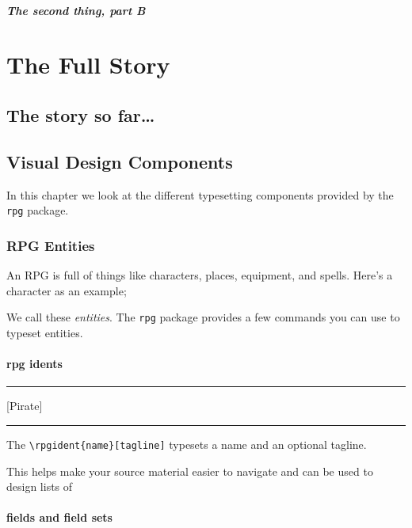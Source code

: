 \lipsum[5]

\subsubsection{The second thing, part B}

\lipsum[6]

\part{The Full Story}

\chapter{The story so far\ldots}



\chapter{Visual Design Components}

In this chapter we look at the different typesetting components provided by the \texttt{rpg} package.

\section{RPG Entities}

An RPG is full of things like characters, places, equipment, and spells. Here's a character as an example;

\rpgdoublevskip

\rpgdoublevskip

We call these \emph{entities}. The \texttt{rpg} package provides a few commands you can use to typeset entities.

\subsection{rpg idents}

\rpgvskip
\hrule
\rpgvskip
{}[Pirate]
\rpgdoublevskip
\hrule
\rpgvskip

The \verb|\rpgident{name}[tagline]| typesets a name and an optional tagline.

This helps make your source material easier to navigate and can be used to design lists of

\subsection{fields and field sets}


